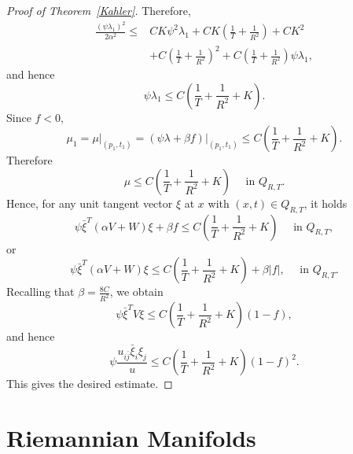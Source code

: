 \documentclass{amsart}
\theoremstyle{definition}
\theoremstyle{remark}
\numberwithin{equation}{section}
\begin{document}
\begin{proof}[Proof of Theorem~\ref{Kahler}]
Therefore,
\begin{equation}
\begin{aligned}
   \frac{(\psi \lambda_1)^2}{2\alpha^2} \leq& CK \psi^2 \lambda_1 + CK\left(\frac1T + \frac{1}{R^2}\right) +CK^2 \\
   &+ C\left(\frac{1}{T} + \frac{1}{R^2}\right)^2 +  C \left(\frac{1}{T}+\frac{1}{R^2}\right) \psi \lambda_1,
\end{aligned}
\end{equation}
and hence
\[
\psi \lambda_1 \leq C\left(\frac{1}{T}+\frac{1}{R^2}+K\right).
\]
Since $f<0$, 
\[
\mu_1=\left.\mu\right|_{\left(p_1, t_1\right)}=\left.(\psi \lambda+\beta f)\right|_{\left(p_1, t_1\right)} \leq C\left(\frac{1}{T}+\frac{1}{R^2}+K\right) .
\]
 Therefore
\[
\mu \leq C\left(\frac{1}{T}+\frac{1}{R^2}+K\right) \quad \text { in } Q_{R, T}.
\]
Hence, for any unit tangent vector $\xi$ at $x$ with $(x, t) \in Q_{R, T}$, it holds
\[
\psi \bar{\xi}^T(\alpha V+W) \xi+\beta f \leq C\left(\frac{1}{T}+\frac{1}{R^2}+K\right) \quad \text { in } Q_{R, T},
\]
or
\[
\psi \bar{\xi}^T(\alpha V+W) \xi \leq C\left(\frac{1}{T}+\frac{1}{R^2}+K\right)+\beta|f|, \quad \text { in } Q_{R, T} .
\]
Recalling that $\beta=\frac{8C}{R^2}$, we obtain
\[
\psi \bar{\xi}^T V \xi \leq C\left(\frac{1}{T}+\frac{1}{R^2}+K\right)(1-f),
\]
and hence
\[
\psi \frac{u_{i \bar{j}} \bar{\xi}_i \xi_j}{u} \leq C\left(\frac{1}{T}+\frac{1}{R^2}+K\right)(1-f)^2 .
\]
This gives the desired estimate.
\end{proof}


\section{Riemannian Manifolds}
\end{document}

